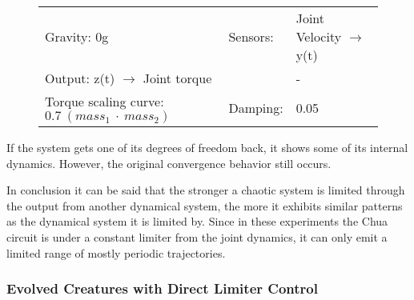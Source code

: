 \documentclass[main]{subfiles}
\begin{document}
\begin{figure}[H]
	\centering
	\begin{minipage}{1.3\textwidth}
	\hspace*{-5em}
	\end{minipage}
	\caption[Limited chaotic controller controlling model leg]{}
	\begin{tabular}{l|ll}
	\hline 
	Gravity: 0g  & Sensors: & Joint Velocity \(\rightarrow\) y(t)\\
	 Output: z(t) \(\rightarrow\) Joint torque & & - \\
	  Torque scaling curve: \(0.7~(mass_1~\cdot~mass_2)\) & Damping: & 0.05 \\
	  \hline
	\end{tabular}

	\label{figure:limited-damped-model-leg8}
\end{figure}

If the system gets one of its degrees of freedom back, it shows some of its internal dynamics. However, the original convergence behavior still occurs.

In conclusion it can be said that the stronger a chaotic system is limited through the output from another dynamical system, the more it exhibits similar patterns as the dynamical system it is limited by. Since in these experiments the Chua circuit is under a constant limiter from the joint dynamics, it can only emit a limited range of mostly periodic trajectories.

\subsubsection{Evolved Creatures with Direct Limiter Control}
\label{subsec:Evolved-lim-creatures}
\end{document}
